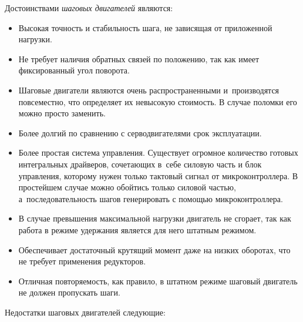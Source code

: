 Достоинствами \textit{шаговых двигателей} являются:

\begin{itemize}
	\item Высокая точность и стабильность шага, не зависящая от приложенной нагрузки.
	
	\item Не требует наличия обратных связей по положению, так как имеет фиксированный угол поворота.
	
	\item Шаговые двигатели являются очень распространенными и~производятся повсеместно, что определяет их невысокую стоимость. В случае поломки его можно просто заменить.
	
	\item Более долгий по сравнению с серводвигателями срок эксплуатации.
	
	\item Более простая система управления. Существует огромное количество готовых интегральных драйверов, сочетающих в~себе силовую часть и блок управления, которому нужен только тактовый сигнал от микроконтроллера. В простейшем случае можно обойтись только силовой частью, а~последовательность шагов генерировать с помощью микроконтроллера.
	
	\item В случае превышения максимальной нагрузки двигатель не сгорает, так как работа в режиме удержания является для него штатным режимом.
	
	\item Обеспечивает достаточный крутящий момент даже на низких оборотах, что не требует применения редукторов.
	
	\item Отличная повторяемость, как правило, в штатном режиме шаговый двигатель не должен пропускать шаги.	
\end{itemize}

Недостатки шаговых двигателей следующие:

